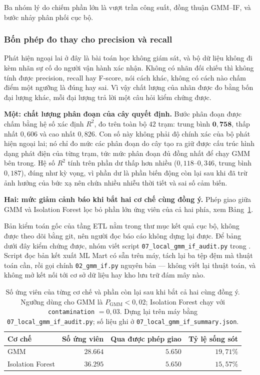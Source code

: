\documentclass[12pt, a4paper]{report}
\begin{document}
Ba nhóm lý do chiếm phần lớn là vượt trần công suất, đồng thuận GMM--IF, và bước nhảy phân
phối cục bộ.

\subsubsection{Bốn phép đo thay cho precision và recall}

Phát hiện ngoại lai ở đây là bài toán học không giám sát, và bộ dữ liệu không đi
kèm nhãn sự cố do người vận hành xác nhận. Không có nhãn đối chiếu thì không tính được
precision, recall hay F-score, nói cách khác, không có cách nào chấm điểm một ngưỡng là
đúng hay sai. Vì vậy chất lượng của nhãn được đo bằng bốn đại lượng khác, mỗi đại lượng trả
lời một câu hỏi kiểm chứng được.

\textbf{Một: chất lượng phân đoạn của cây quyết định.} Bước phân đoạn được chấm bằng hệ
số xác định $R^2$, đo trên toàn bộ $42$ trạm: trung bình $\mathbf{0{,}758}$, thấp nhất
$0{,}606$ và cao nhất $0{,}826$. Con số này không phải độ chính xác của bộ phát
hiện ngoại lai; nó chỉ đo mức các phân đoạn do cây tạo ra giữ được cấu trúc hình dạng phát
điện của từng trạm, tức mức phân đoạn đủ đồng nhất để chạy GMM bên trong. Hệ số $R^2$ tính
trên phần dư thấp hơn nhiều ($0{,}118$--$0{,}346$, trung bình $0{,}187$), đúng như kỳ vọng,
vì phần dư là phần biến động còn lại sau khi đã trừ ảnh hưởng của bức xạ nên chứa nhiều
nhiễu thời tiết và sai số cảm biến.

\textbf{Hai: mức giảm cảnh báo khi bắt hai cơ chế cùng đồng ý.} Phép giao giữa GMM và
Isolation Forest lọc bỏ phần lớn ứng viên của cả hai phía, xem Bảng~\ref{tab:song_sot_and}.

Bản kiểm toán gốc của tầng ETL nằm trong thư mục kết quả cục bộ, không được theo dõi bằng
git, nên người đọc báo cáo không dựng lại được. Để bảng dưới đây kiểm chứng được, nhóm viết
script \texttt{07\_local\_gmm\_if\_audit.py} trong .
Script đọc bản kết xuất ML Mart có sẵn trên máy, tách lại ba tệp đệm mà thuật toán cần, rồi
gọi chính \texttt{02\_gmm\_if.py} nguyên bản --- không viết lại thuật toán, và không mở kết nối
tới cơ sở dữ liệu hay kho lưu trữ đám mây nào.

\begin{table}[htbp]
\centering
\caption{Số ứng viên của từng cơ chế và phần còn lại sau khi bắt cả hai cùng đồng ý. Ngưỡng
dùng cho GMM là $P_{\text{GMM}} < 0{,}02$; Isolation Forest chạy với
\texttt{contamination} $= 0{,}03$. Dựng lại trên máy bằng
\texttt{07\_local\_gmm\_if\_audit.py}; số liệu ghi ở \texttt{07\_local\_gmm\_if\_summary.json}.}
\label{tab:song_sot_and}
\small
\begin{tabular}{l r r r}
\toprule
\textbf{Cơ chế} & \textbf{Số ứng viên} & \textbf{Qua được phép giao} & \textbf{Tỷ lệ sống sót} \\
\midrule
GMM              & $28.664$ & $5.650$ & $19{,}71\%$ \\
Isolation Forest & $36.295$ & $5.650$ & $15{,}57\%$ \\
\bottomrule
\end{tabular}
\end{table}
\end{document}
